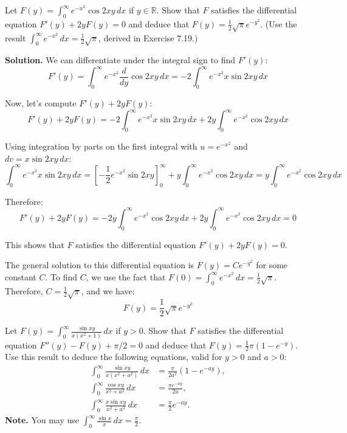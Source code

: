 \begin{problembox}
Let $F(y) = \int_{0}^{\infty} e^{-x^2} \cos 2xy \, dx$ if $y \in \mathbb{R}$. Show that $F$ satisfies the differential equation $F'(y) + 2y F(y) = 0$ and deduce that $F(y) = \frac{1}{2} \sqrt{\pi} e^{-y^2}$. (Use the result $\int_{0}^{\infty} e^{-x^2} \, dx = \frac{1}{2} \sqrt{\pi}$, derived in Exercise 7.19.)
\end{problembox}

\noindent\textbf{Solution.}
We can differentiate under the integral sign to find $F'(y)$:
\[F'(y) = \int_{0}^{\infty} e^{-x^2} \frac{d}{dy} \cos 2xy \, dx = -2 \int_{0}^{\infty} e^{-x^2} x \sin 2xy \, dx\]

Now, let's compute $F'(y) + 2y F(y)$:
\[F'(y) + 2y F(y) = -2 \int_{0}^{\infty} e^{-x^2} x \sin 2xy \, dx + 2y \int_{0}^{\infty} e^{-x^2} \cos 2xy \, dx\]

Using integration by parts on the first integral with $u = e^{-x^2}$ and $dv = x \sin 2xy \, dx$:
\[\int_{0}^{\infty} e^{-x^2} x \sin 2xy \, dx = \left[-\frac{1}{2} e^{-x^2} \sin 2xy\right]_{0}^{\infty} + y \int_{0}^{\infty} e^{-x^2} \cos 2xy \, dx = y \int_{0}^{\infty} e^{-x^2} \cos 2xy \, dx\]

Therefore:
\[F'(y) + 2y F(y) = -2y \int_{0}^{\infty} e^{-x^2} \cos 2xy \, dx + 2y \int_{0}^{\infty} e^{-x^2} \cos 2xy \, dx = 0\]

This shows that $F$ satisfies the differential equation $F'(y) + 2y F(y) = 0$.

The general solution to this differential equation is $F(y) = C e^{-y^2}$ for some constant $C$. To find $C$, we use the fact that $F(0) = \int_{0}^{\infty} e^{-x^2} \, dx = \frac{1}{2} \sqrt{\pi}$. Therefore, $C = \frac{1}{2} \sqrt{\pi}$, and we have:
\[F(y) = \frac{1}{2} \sqrt{\pi} e^{-y^2}\]

\begin{problembox}
Let $F(y) = \int_{0}^{\infty} \frac{\sin xy}{x(x^2 + 1)} \, dx$ if $y > 0$. Show that $F$ satisfies the differential equation $F''(y) - F(y) + \pi / 2 = 0$ and deduce that $F(y) = \frac{1}{2} \pi (1 - e^{-y})$. Use this result to deduce the following equations, valid for $y > 0$ and $a > 0$:
\begin{align*}
\int_{0}^{\infty} \frac{\sin xy}{x(x^2 + a^2)} \, dx &= \frac{\pi}{2a^2} (1 - e^{-ay}), \\
\int_{0}^{\infty} \frac{\cos xy}{x^2 + a^2} \, dx &= \frac{\pi e^{-ay}}{2a}, \\
\int_{0}^{\infty} \frac{x \sin xy}{x^2 + a^2} \, dx &= \frac{\pi}{2} e^{-ay}.
\end{align*}
\textbf{Note.} You may use $\int_{0}^{\infty} \frac{\sin x}{x} \, dx = \frac{\pi}{2}.$
\end{problembox}

